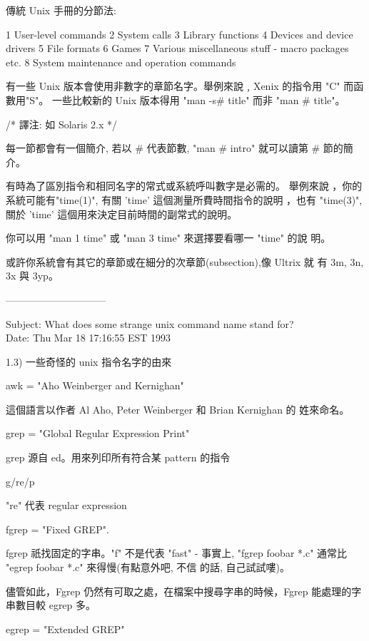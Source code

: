\documentclass{letter}
\begin{document}
\begin{CJK}{Bg5}{ming}
	傳統 Unix 手冊的分節法:

	        1       User-level  commands
	        2       System calls
	        3       Library functions
	        4       Devices and device drivers
	        5       File formats
	        6       Games
	        7       Various miscellaneous stuff -  macro packages etc.
	        8       System maintenance and operation commands

	有一些 Unix 版本會使用非數字的章節名字。舉例來說﹐Xenix 的指令用
	"C" 而函數用"S"。 一些比較新的 Unix 版本得用 "man -s\# title" 而非 
	"man \# title"。 
	
	/* 
             譯注: 如 Solaris 2.x   
	*/
      
	每一節都會有一個簡介, 若以 \# 代表節數, "man \# intro" 就可以讀第 \# 
	節的簡介。

	有時為了區別指令和相同名字的常式或系統呼叫數字是必需的。 舉例來說
	，你的系統可能有"time(1)", 有關 'time' 這個測量所費時間指令的說明
	，也有 "time(3)", 關於 'time' 這個用來決定目前時間的副常式的說明。 

	你可以用  "man 1 time" 或 "man 3 time" 來選擇要看哪一 "time" 的說
	明。

	或許你系統會有其它的章節或在細分的次章節(subsection),像 Ultrix 就
	有 3m, 3n, 3x 與 3yp。
 
------------------------------

Subject: What does {some strange unix command name} stand for? \\
Date: Thu Mar 18 17:16:55 EST 1993


1.3)  一些奇怪的 unix 指令名字的由來

    awk = "Aho Weinberger and Kernighan"

	這個語言以作者 Al Aho, Peter Weinberger 和 Brian Kernighan 的
	姓來命名。

    grep = "Global Regular Expression Print"

	grep 源自 ed。用來列印所有符合某 pattern 的指令

	g/re/p

	"re" 代表 regular expression

    fgrep = "Fixed GREP".

	fgrep 祇找固定的字串。"f" 不是代表 "fast" - 事實上, "fgrep 
	foobar *.c" 通常比 "egrep foobar *.c" 來得慢(有點意外吧, 不信
	的話, 自己試試嘍)。

	儘管如此，Fgrep 仍然有可取之處，在檔案中搜尋字串的時候，Fgrep 
	能處理的字串數目較 egrep 多。

    egrep = "Extended GREP"


\end{CJK}
\end{document}
